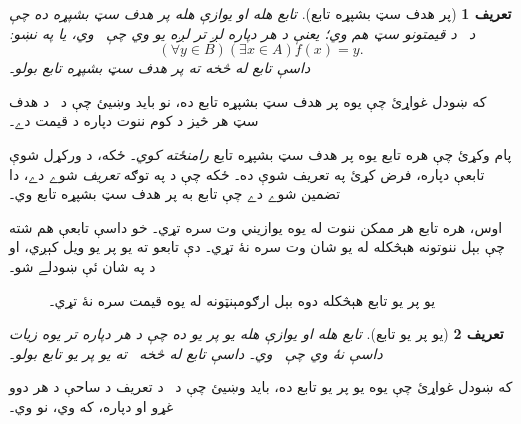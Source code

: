 \documentclass[12pt,a4paper,oneside]{report}
\newcommand{\Setabs}[2]{\{#1 : #2\}}
\newcommand{\ran}[1]{\mathrm{ran}(#1)}
\newcommand{\ollabel}[1]{\label{\pspart:\pschapter:\pssection:#1}}
\newlength{\olphotowidth}
\newcommand{\olasset}[2][\olphotowidth]{\centering\begin{LTR}\centering\resizebox{#1}{!}{}\end{LTR}}
\newenvironment{explain}{}{}
\newtheorem{defn}{تعريف}[section]
\begin{document}
\begin{defn}[پر هدف سټ بشپړه تابع]
تابع  هله او يوازې هله \emph{پر هدف سټ بشپړه}
ده چې  د~ د قيمتونو سټ هم وي؛ يعنې د هر 
دپاره لږ تر لږه يو  وي چې~ وي، يا په نښو:
\[
  (\forall y \in B)(\exists x \in A)f(x) = y.
\]
داسې تابع له  څخه  ته پر هدف سټ بشپړه تابع بولو۔
\end{defn}

\begin{explain}
که ښودل غواړئ چې  يوه پر هدف سټ بشپړه تابع ده، نو بايد وښيئ چې د~
د هدف سټ هر څيز د کوم ننوت  دپاره د  قيمت دے۔

پام وکړئ چې هره تابع يوه پر هدف سټ بشپړه تابع \emph{رامنځته کوي}۔ ځکه،
د ورکړل شوې تابعې  دپاره، فرض کړئ
\LR{$f' \colon A \to \ran{f}$} په  تعريف شوې ده۔ ځکه
چې \LR{$\ran{f}$} د \LR{$\Setabs{f(x) \in B}{x \in A}$} په توګه \emph{تعريف}
شوے دے، دا تضمين شوے دے چې تابع  به پر هدف سټ بشپړه تابع وي۔
\end{explain}

\begin{explain}
اوس، هره تابع هر ممکن ننوت له يوه يوازيني وت سره تړي۔ خو داسې
تابعې هم شته چې بېل ننوتونه هېڅکله له يو شان وت سره نۀ تړي۔ دې
تابعو ته يو پر يو ويل کېږي، او د  په شان
ئې ښودلے شو۔
\begin{figure}
  \olasset{assets/diagrams/injective.tikz}
  \caption{يو پر يو تابع هېڅکله دوه بېل ارګومېنټونه له يوه قيمت سره نۀ تړي۔}
  \ollabel{fig:injective}
\end{figure}
\end{explain}

\begin{defn}[يو پر يو تابع]
تابع  هله او يوازې هله \emph{يو پر يو}
ده چې د هر  دپاره تر يوه زيات داسې  نۀ وي
چې~ وي۔ داسې تابع له  څخه~ ته يو پر يو تابع بولو۔
\end{defn}

\begin{explain}
که ښودل غواړئ چې  يوه يو پر يو تابع ده، بايد وښيئ چې د~
د تعريف د ساحې د هر دوو غړو  او  دپاره،
که  وي، نو  وي۔
\end{explain}
\end{document}
